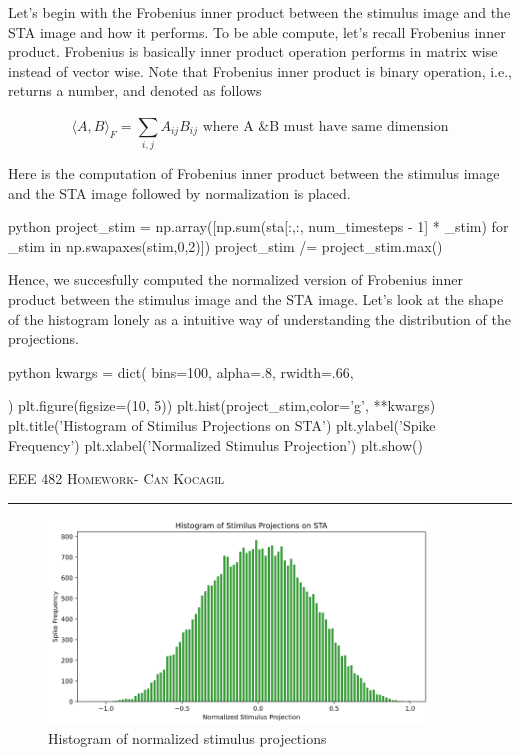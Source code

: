 \documentclass[12pt]{amsart}
\begin{document}
\bigskip

Let's begin with the Frobenius inner product between the stimulus image and the STA image and how it performs. To be able compute, let's recall Frobenius inner product. Frobenius is basically inner product operation performs in matrix wise instead of vector wise. Note that Frobenius inner product is binary operation, i.e., returns a number, and denoted as follows

\begin{equation}
    \langle A,B \rangle_F = \sum_{i,j}^{}A_{ij} B_{ij}  \text{ where A \& B must have same dimension} 
\end{equation}

Here is the computation of Frobenius inner product between the stimulus image and the STA image followed by normalization is placed.

\begin{mintedbox}{python}
project_stim = np.array([np.sum(sta[:,:, num_timesteps - 1] * _stim) for _stim in np.swapaxes(stim,0,2)]) 
project_stim /= project_stim.max()
\end{mintedbox}


Hence, we succesfully computed the normalized version of Frobenius inner product between the stimulus image and the STA image. Let's look at the shape of the histogram lonely as a intuitive way of understanding the distribution of the projections.

\begin{mintedbox}{python}
kwargs = dict(
    bins=100, 
    alpha=.8,
    rwidth=.66,
   
)
plt.figure(figsize=(10, 5))
plt.hist(project_stim,color='g', **kwargs)
plt.title('Histogram of Stimilus Projections on STA')
plt.ylabel('Spike Frequency')
plt.xlabel('Normalized Stimulus Projection')
plt.show()
\end{mintedbox}

\newpage
{\scshape EEE 482} \hfill {\scshape \large  Homework-\relax} \hfill {\scshape Can Kocagil}
\smallskip
\hrule
\vspace{2mm}

\begin{figure}[h]
    \centering
    \includegraphics[width = 0.9\textwidth]{images/HistogramSTA.png}
    \caption{Histogram of normalized stimulus projections}
\end{figure}
\end{document}

